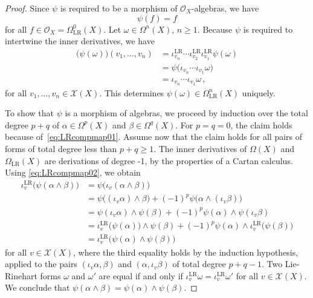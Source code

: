 \documentclass[12pt,reqno, a4paper]{amsart}
\numberwithin{equation}{section}
\theoremstyle{plain}
\theoremstyle{definition}
\theoremstyle{remark}
\newcommand{\calO}{\mathcal{O}}
\newcommand{\calX}{\mathcal{X}}
\begin{document}
\begin{proof}
Since $\psi$ is required to be a morphism of $\calO_X$-algebras, we have
\begin{equation}
\label{eq:LRcompmap01}
  \psi(f) = f
\end{equation}
for all $f \in \calO_X = \Omega^0_\mathrm{LR}(X)$. Let $\omega \in \Omega^n(X)$, $n \geq 1$. Because $\psi$ is required to intertwine the inner derivatives, we have
\begin{equation}
\label{eq:LRcompmap02}
\begin{split}
  \bigl(\psi(\omega)\bigr)(v_1, \ldots, v_n)
  &=
  \iota^\mathrm{LR}_{v_n} \cdots \iota^\mathrm{LR}_{v_2}
  \iota^\mathrm{LR}_{v_1} \psi(\omega)
  \\
  &=
  \psi\bigl( \iota_{v_n} \cdots \iota_{v_1} \omega \bigr)
  \\
  &=
  \iota_{v_n} \cdots \iota_{v_1} \omega
  \,,
\end{split}
\end{equation}
for all $v_1, \ldots, v_n \in \calX(X)$. This determines $\psi(\omega) \in \Omega^n_\mathrm{LR}(X)$ uniquely.

To show that $\psi$ is a morphism of algebras, we proceed by induction over the total degree $p+q$ of $\alpha \in \Omega^p(X)$ and $\beta \in \Omega^q(X)$. For $p = q = 0$, the claim holds because of~\eqref{eq:LRcompmap01}. Assume now that the claim holds for all pairs of forms of total degree less than $p+q \geq 1$. The inner derivatives of $\Omega(X)$ and $\Omega_\mathrm{LR}(X)$ are derivations of degree -1, by the properties of a Cartan calculus. Using \eqref{eq:LRcompmap02}, we obtain
\begin{equation}
\label{eq:LRcompmap03}
\begin{split}
  \iota^\mathrm{LR}_v \bigl( \psi(\alpha \wedge \beta) \bigr)
  &= \psi\bigl( \iota_v (\alpha \wedge \beta) \bigr)
  \\
  &= \psi\bigl( (\iota_v \alpha) \wedge \beta \bigr)
  + (-1)^p \psi\bigl( \alpha \wedge (\iota_v \beta) \bigr)
  \\
  &= \psi(\iota_v \alpha) \wedge \psi(\beta)
  + (-1)^p \psi(\alpha) \wedge \psi(\iota_v \beta)
  \\
  &= \iota^\mathrm{LR}_v \bigl( \psi(\alpha)\bigr)
     \wedge \psi(\beta)
  + (-1)^p \psi(\alpha) \wedge \iota^\mathrm{LR}_v \bigl( \psi(\beta) \bigr)
  \\
  &= \iota^\mathrm{LR}_v \bigl( \psi(\alpha) \wedge \psi(\beta) \bigr)
\end{split}
\end{equation}
for all $v \in \calX(X)$, where the third equality holds by the induction hypothesis, applied to the pairs $(\iota_v\alpha, \beta)$ and $(\alpha, \iota_v\beta)$ of total degree $p+q-1$. Two Lie-Rinehart forms $\omega$ and $\omega'$ are equal if and only if $\iota^\mathrm{LR}_v \omega = \iota^\mathrm{LR}_v \omega'$ for all $v \in \calX(X)$. We conclude that $\psi(\alpha \wedge \beta) = \psi(\alpha) \wedge \psi(\beta)$.


\end{proof}
\end{document}
